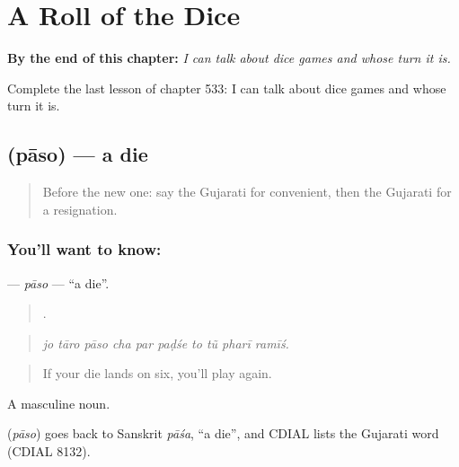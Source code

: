 
\chapter{A Roll of the Dice}
\label{ch:gu-a-roll-of-the-dice}

\begin{chapteropening}
\textbf{By the end of this chapter:} \emph{I can talk about dice games and whose turn it is.}

Complete the last lesson of chapter 533: I can talk about dice games and whose turn it is.
\end{chapteropening}

\section[\texorpdfstring{\gu{પાસો} (pāso)}{પાસો (pāso)}]{ (pāso) — a die}

\label{lesson:GU-C533-paso}



\begin{quote}
Before the new one: say the Gujarati for convenient, then the Gujarati for a resignation.
\end{quote}

\subsection*{You'll want to know: }
\textbf{} — \emph{pāso} — \textquotedblleft{}a die\textquotedblright{}.

\begin{quote}
         .
\end{quote}

\begin{quote}
\emph{jo tāro pāso cha par paḍśe to tũ pharī ramīś.}
\end{quote}

\begin{quote}
If your die lands on six, you'll play again.
\end{quote}

A masculine noun.

\begin{cousinweb}
\textbf{} (\emph{pāso}) goes back to Sanskrit \emph{pāśa}, \textquotedblleft{}a die\textquotedblright{}, and CDIAL lists the Gujarati word (CDIAL 8132).
\end{cousinweb}

